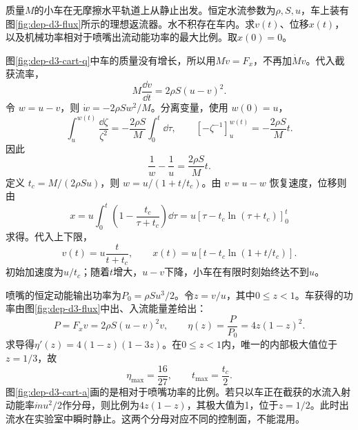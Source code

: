 \begin{example}[水流推动返流小车]
质量$M$的小车在无摩擦水平轨道上从静止出发。恒定水流参数为$\rho,S,u$，车上装有图\ref{fig:dep-d3-flux}所示的理想返流器。水不积存在车内。求$v(t)$、位移$x(t)$，以及机械功率相对于喷嘴出流动能功率的最大比例。取$x(0)=0$。
\end{example}
\begin{solution}
图\ref{fig:dep-d3-cart-q}中车的质量没有增长，所以用$M\dot v=F_x$，不再加$\dot Mv$。代入截获流率，
\[
 M\frac{\dd v}{\dd t}=2\rho S(u-v)^2.
\]
令 $w=u-v$，则 $\dot w=-2\rho Sw^2/M$。分离变量，使用 $w(0)=u$，
\[
\int_u^{w(t)}\frac{\dd\zeta}{\zeta^2}
=-\frac{2\rho S}{M}\int_0^t\dd\tau,
\qquad [-\zeta^{-1}]_u^{w(t)}=-\frac{2\rho S}{M}t.
\]
因此
\[
 \frac1w-\frac1u=\frac{2\rho S}{M}t.
\]
定义 $t_c=M/(2\rho Su)$，则 $w=u/(1+t/t_c)$。由 $v=u-w$ 恢复速度，位移则由
\[
x=u\int_0^t\left(1-\frac{t_c}{\tau+t_c}\right)\dd\tau
=u[\tau-t_c\ln(\tau+t_c)]_0^t
\]
求得。代入上下限，
\[
 \boxed{v(t)=u\frac{t}{t+t_c}},\qquad
 \boxed{x(t)=u\left[t-t_c\ln(1+t/t_c)\right]}.
\]
初始加速度为$u/t_c$；随着$t$增大，$u-v$下降，小车在有限时刻始终达不到$u$。

喷嘴的恒定动能输出功率为$P_0=\rho Su^3/2$。令$z=v/u$，其中$0\le z<1$。车获得的功率由图\ref{fig:dep-d3-flux}中出、入流能量差给出：
\[
 P=F_xv=2\rho S(u-v)^2v,\qquad
 \eta(z)=\frac P{P_0}=4z(1-z)^2.
\]
求导得$\eta'(z)=4(1-z)(1-3z)$。在$0\leq z<1$内，唯一的内部极大值位于$z=1/3$，故
\[
 \boxed{\eta_{\max}=\frac{16}{27}},\qquad t_{\max}=\frac{t_c}{2}.
\]
图\ref{fig:dep-d3-cart-a}画的是相对于喷嘴功率的比例。若只以车正在截获的水流入射动能率$\dot m u^2/2$作分母，则比例为$4z(1-z)$，其极大值为1，位于$z=1/2$。此时出流水在实验室中瞬时静止。这两个分母对应不同的控制面，不能混用。
\end{solution}
